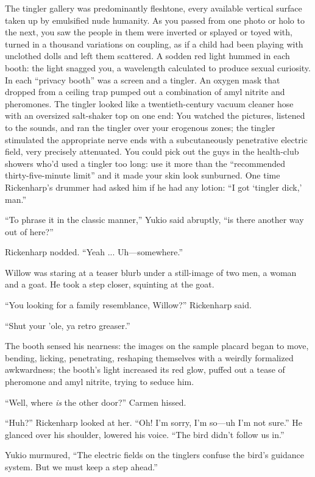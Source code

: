 The tingler gallery was predominantly fleshtone, every available vertical surface taken up by emulsified nude humanity. As you passed from one photo or holo to the next, you saw the people in them were inverted or splayed or toyed with, turned in a thousand variations on coupling, as if a child had been playing with unclothed dolls and left them scattered. A sodden red light hummed in each booth: the light snagged you, a wavelength calculated to produce sexual curiosity. In each ``privacy booth'' was a screen and a tingler. An oxygen mask that dropped from a ceiling trap pumped out a combination of amyl nitrite and pheromones. The tingler looked like a twentieth-century vacuum cleaner hose with an oversized salt-shaker top on one end: You watched the pictures, listened to the sounds, and ran the tingler over your erogenous zones; the tingler stimulated the appropriate nerve ends with a subcutaneously penetrative electric field, very precisely attenuated. You could pick out the guys in the health-club showers who'd used a tingler too long: use it more than the ``recommended thirty-five-minute limit'' and it made your skin look sunburned. One time Rickenharp's drummer had asked him if he had any lotion: ``I got ‘tingler dick,' man.''

``To phrase it in the classic manner,'' Yukio said abruptly, ``is there another way out of here?''

Rickenharp nodded. ``Yeah ... Uh---somewhere.''

Willow was staring at a teaser blurb under a still-image of two men, a woman and a goat. He took a step closer, squinting at the goat.

``You looking for a family resemblance, Willow?'' Rickenharp said.

``Shut your 'ole, ya retro greaser.''

The booth sensed his nearness: the images on the sample placard began to move, bending, licking, penetrating, reshaping themselves with a weirdly formalized awkwardness; the booth's light increased its red glow, puffed out a tease of pheromone and amyl nitrite, trying to seduce him.

``Well, where \textit{is} the other door?'' Carmen hissed.

``Huh?'' Rickenharp looked at her. ``Oh! I'm sorry, I'm so---uh I'm not sure.'' He glanced over his shoulder, lowered his voice. ``The bird didn't follow us in.''

Yukio murmured, ``The electric fields on the tinglers confuse the bird's guidance system. But we must keep a step ahead.''


